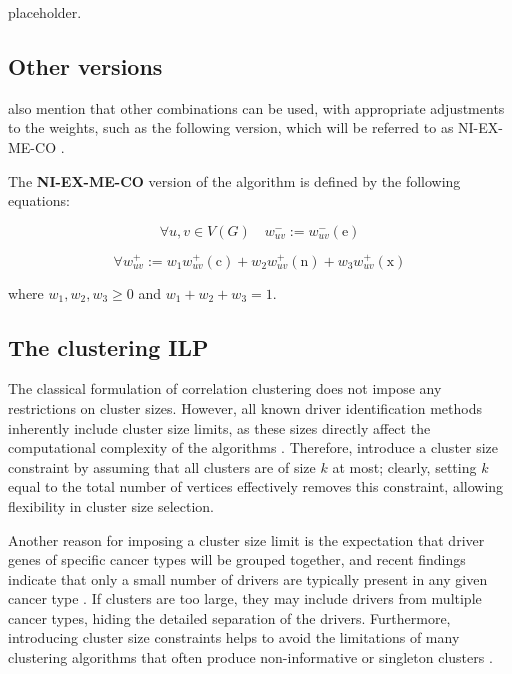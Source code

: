 placeholder. 

\subsection{Other versions}

\textcite{c3} also mention that other combinations can be used, with appropriate adjustments to the weights, such as the following version, which will be referred to as NI-EX-ME-CO .

\begin{definition}[NI-EX-ME-CO]
    The \textbf{NI-EX-ME-CO} version of the algorithm is defined by the following equations:

    \begin{equation}
        \forall u, v \in V(G) \quad w_{uv}^- := w_{uv}^-(\mathrm e)
    \end{equation}

    \begin{equation}
        \forall w_{uv}^+ := w_1 w_{uv}^+(\mathrm c) + w_2 w_{uv}^+(\mathrm n) + w_3 w_{uv}^+(\mathrm x)
    \end{equation}

    where $w_1, w_2, w_3 \ge 0$ and $w_1 + w_2 + w_3 = 1$.
\end{definition}

\subsection{The clustering ILP}

The classical formulation of correlation clustering does not impose any restrictions on cluster sizes. However, all known driver identification methods inherently include cluster size limits, as these sizes directly affect the computational complexity of the algorithms . Therefore, \textcite{c3} introduce a cluster size constraint by assuming that all clusters are of size $k$ at most; clearly, setting $k$ equal to the total number of vertices effectively removes this constraint, allowing flexibility in cluster size selection.

Another reason for imposing a cluster size limit is the expectation that driver genes of specific cancer types will be grouped together, and recent findings indicate that only a small number of drivers are typically present in any given cancer type . If clusters are too large, they may include drivers from multiple cancer types, hiding the detailed separation of the drivers. Furthermore, introducing cluster size constraints helps to avoid the limitations of many clustering algorithms that often produce non-informative  or singleton clusters .

